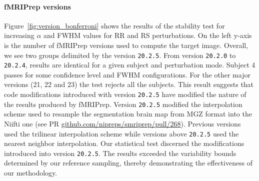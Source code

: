 \documentclass[lettersize,journal]{IEEEtran}
\newcommand{\fmriprep}{fMRIPrep\xspace}
\begin{document}
\paragraph*{\fmriprep versions} Figure~\ref{fig:version_bonferroni} shows the results of the stability test for increasing $\alpha$ and FWHM values for RR and RS perturbations. On the left y-axis is the number of \fmriprep versions used to compute the target image. Overall, we see two groups delimited by the version \texttt{20.2.5}. From version \texttt{20.2.0} to \texttt{20.2.4}, results are identical for a given subject and perturbation mode. Subject 4 passes for some confidence level and FWHM configurations. For the other major versions (21, 22 and 23) the test rejects all the subjects. This result suggests that code modifications introduced with version \texttt{20.2.5} have modified the nature of the results produced by \fmriprep. Version \texttt{20.2.5} modified the interpolation scheme used to resample the segmentation brain map from MGZ format into the Niifti one (see PR \href{https://github.com/nipreps/smriprep/pull/268}{\url{github.com/nipreps/smriprep/pull/268}}). Previous versions used the trilinear interpolation scheme while versions above \texttt{20.2.5} used the nearest neighbor interpolation. Our statistical test discerned the modifications introduced into version \texttt{20.2.5}. The results exceeded the variability bounds determined by our reference sampling, thereby demonstrating the effectiveness of our methodology.
\end{document}
